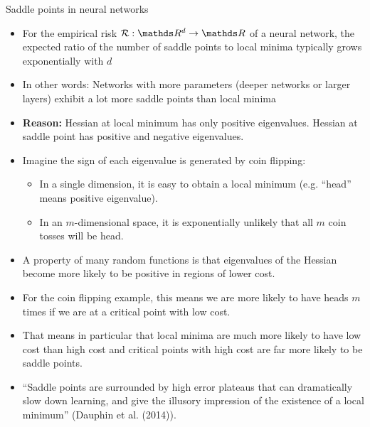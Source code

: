 \documentclass[11pt,compress,t,notes=noshow, xcolor=table]{beamer}
\begin{document}
\begin{vbframe}{Saddle points in neural networks}
\begin{itemize}
    \setlength{\itemsep}{1em}
    \item For the empirical risk $\risk : \R^d \rightarrow \R$ of a neural network, the expected ratio of the number of saddle points to local minima typically grows exponentially with $d$
    \item In other words: Networks with more parameters (deeper networks or larger layers) exhibit a lot more saddle points than local minima
    \item \textbf{Reason:} Hessian at local minimum has only positive eigenvalues.
        Hessian at saddle point has positive and negative eigenvalues.
\end{itemize}

\framebreak

\begin{itemize}
    \item Imagine the sign of each eigenvalue is generated by coin flipping:
    \begin{itemize}
      \item In a single dimension, it is easy to obtain a local minimum (e.g. \enquote{head} means positive eigenvalue).
      \item In an $m$-dimensional space, it is exponentially unlikely that all $m$ coin tosses will be head.
    \end{itemize}
    \item A property of many random functions is that eigenvalues of the Hessian become more likely to be positive in regions of lower cost.
    \item For the coin flipping example, this means we are more likely to have heads $m$ times if we are at a critical point with low cost.
    \item That means in particular that local minima are much more likely to have low cost than high cost and critical points with high cost are far more likely to be saddle points.

    \item \enquote{Saddle points are surrounded by high error plateaus that can dramatically slow down learning, and give the illusory impression of the existence of a local minimum} (Dauphin et al. (2014)).


\end{itemize}
\end{vbframe}
\end{document}
